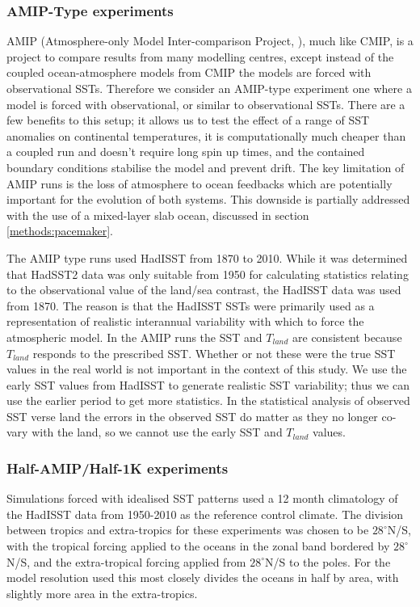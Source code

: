 \subsubsection{AMIP-Type experiments}\label{methods:amip}
AMIP (Atmosphere-only Model Inter-comparison Project, \citep{Gates1999}), much 
like CMIP, is a project to compare results from many modelling centres, except 
instead of the coupled ocean-atmosphere models from CMIP the models are forced 
with observational SSTs.  Therefore we consider an AMIP-type experiment one 
where a model is forced with observational, or similar to observational SSTs.  
There are a few benefits to this setup; it allows us to test the effect of a 
range of SST anomalies on continental temperatures, it is computationally much 
cheaper than a coupled run and doesn't require long spin up times, and the 
contained boundary conditions stabilise the model and prevent drift. The key 
limitation of AMIP runs is the loss of atmosphere to ocean feedbacks which are 
potentially important for the evolution of both systems. This downside is 
partially addressed with the use of a mixed-layer slab ocean, discussed in 
section \ref{methods:pacemaker}.

The AMIP type runs used HadISST from 1870 to 2010. While it was determined that 
HadSST2 data was only suitable from 1950 for calculating statistics relating to 
the observational value of the land/sea contrast, the HadISST data was used from 
1870. The reason is that the HadISST SSTs were primarily used as a 
representation of realistic interannual variability with which to force the 
atmospheric model.  In the AMIP runs the SST and $T_{land}$ are consistent 
because $T_{land}$ responds to the prescribed SST.  Whether or not these were 
the true SST values in the real world is not important in the context of this 
study.  We use the early SST values from HadISST to generate realistic SST 
variability; thus we can use the earlier period to get more statistics. In the 
statistical analysis of observed SST verse land the errors in the observed SST 
do matter as they no longer co-vary with the land, so we cannot use the early 
SST and $T_{land}$ values.

\subsubsection{Half-AMIP/Half-1K experiments}
Simulations forced with idealised SST patterns used a 12 month climatology of 
the HadISST data from 1950-2010 as the reference control climate. The division 
between tropics and extra-tropics for these experiments was chosen to be 
$28^{\circ}$N/S, with the tropical forcing applied to the oceans in the zonal 
band bordered by $28^{\circ}$N/S, and the extra-tropical forcing applied from 
$28^{\circ}$N/S to the poles. For the model resolution used this most closely 
divides the oceans in half by area, with slightly more area in the 
extra-tropics.

